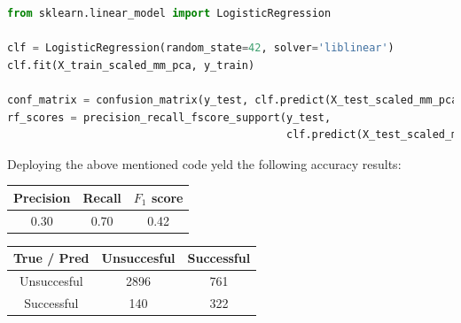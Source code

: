 \begin{lstlisting}[language=Python, caption= Deploying logistic regression]
from sklearn.linear_model import LogisticRegression

clf = LogisticRegression(random_state=42, solver='liblinear')
clf.fit(X_train_scaled_mm_pca, y_train)

conf_matrix = confusion_matrix(y_test, clf.predict(X_test_scaled_mm_pca))
rf_scores = precision_recall_fscore_support(y_test,
                                            clf.predict(X_test_scaled_mm_pca))
\end{lstlisting}
Deploying the above mentioned code yeld the following accuracy results:
\begin{center}
    \begin{tabular}{|c|c|c|}
        \hline
        Precision & Recall & \(F_1\) score \\
        \hline
        0.30 & 0.70 & 0.42 \\
        \hline
    \end{tabular}
    \quad     
    \begin{tabular}{|c|c|c|}
        \hline
         True / Pred & Unsuccesful & Successful \\
        \hline
        Unsuccesful & 2896 & 761 \\
        \hline
        Successful & 140 & 322\\
        \hline
    \end{tabular}
\end{center}
